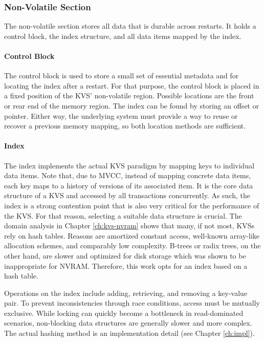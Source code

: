 \subsubsection{Non-Volatile Section}

The non-volatile section stores all data that is durable across restarts. It
holds a control block, the index structure, and all data items mapped by the
index.

\paragraph{Control Block}

The control block is used to store a small set of essential metadata and for
locating the index after a restart. For that purpose, the control block is
placed in a fixed position of the \ac{KVS}' non-volatile region. Possible
locations are the front or rear end of the memory region. The index can be found
by storing an offset or pointer. Either way, the underlying system must provide
a way to reuse or recover a previous memory mapping, so both location methods
are sufficient.

\paragraph{Index}

The index implements the actual \ac{KVS} paradigm by mapping keys to individual
data items. Note that, due to \ac{MVCC}, instead of mapping concrete data items,
each key maps to a history of versions of its associated item. It is the core
data structure of a \ac{KVS} and accessed by all transactions concurrently. As
such, the index is a strong contention point that is also very critical for the
performance of the \ac{KVS}. For that reason, selecting a suitable data
structure is crucial. The domain analysis in Chapter \ref{ch:kvs-nvram} shows
that many, if not most, \acp{KVS} rely on hash tables. Reasons are amortized
constant access, well-known array-like allocation schemes, and comparably low
complexity. B-trees or radix trees, on the other hand, are slower and optimized
for disk storage which was shown to be inappropriate for \ac{NVRAM}. Therefore,
this work opts for an index based on a hash table.

Operations on the index include adding, retrieving, and removing a key-value
pair. To prevent inconsistencies through race conditions, access must be
mutually exclusive. While locking can quickly become a bottleneck in
read-dominated scenarios, non-blocking data structures are generally slower and
more complex. The actual hashing method is an implementation detail (see Chapter \ref{ch:impl}).

